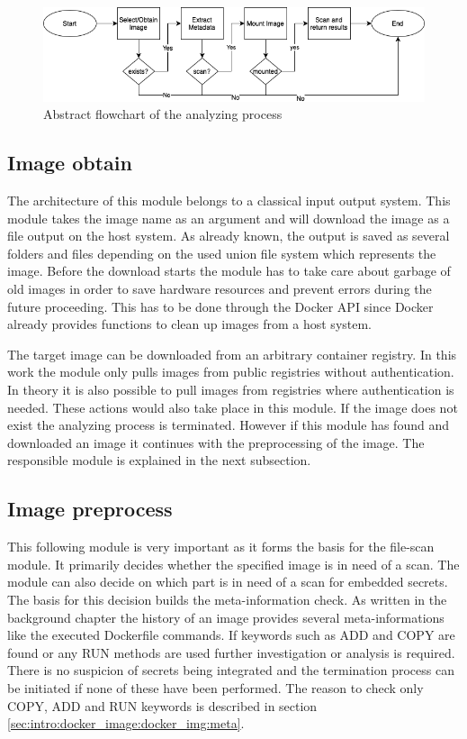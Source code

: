 \begin{figure}[htbp]
\centering
\includegraphics[width=1.0\textwidth]{gfx/examples/basic_workflow_scan}
\caption{Abstract flowchart of the analyzing process}
\label{ch:theory:analyzing process:fig}
\end{figure}

\subsection{Image obtain}
\label{ch:theory:analyzing_process:obtain}
The architecture of this module belongs to a classical input output system. This module takes the image name as an argument and will download the image as a file output on the host system. 
As already known, the output is saved as several folders and files depending on the used union file system which represents the image. 
Before the download starts the module has to take care about garbage of old images in order to save hardware resources and prevent errors during the future proceeding. 
This has to be done through the Docker API since Docker already provides functions to clean up images from a host system.

The target image can be downloaded from an arbitrary container registry.
In this work the module only pulls images from public registries without authentication. 
In theory it is also possible to pull images from registries where authentication is needed. 
These actions would also take place in this module.
If the image does not exist the analyzing process is terminated.
However if this module has found and downloaded an image it continues with the preprocessing of the image. 
The responsible module is explained in the next subsection.

\subsection{Image preprocess}
\label{ch:theory:analyzing_process:prepro}
This following module is very important as it forms the basis for the file-scan module. 
It primarily decides whether the specified image is in need of a scan.
The module can also decide on which part is in need of a scan for embedded secrets. 
The basis for this decision builds the meta-information check. 
As written in the background chapter the history of an image provides several meta-informations like the executed Dockerfile commands.
If keywords such as ADD and COPY are found or any RUN methods are used further investigation or analysis is required.
There is no suspicion of secrets being integrated and the termination process can be initiated if none of these have been performed.
The reason to check only COPY, ADD and RUN keywords is described in section \ref{sec:intro:docker_image:docker_img:meta}. 

